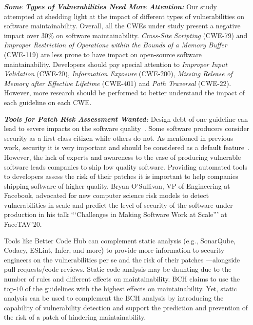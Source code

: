 \documentclass[smallextended]{svjour3}       %
\begin{document}
\textit{\textbf{Some Types of Vulnerabilities Need More Attention:}} 
Our study attempted at shedding light at the impact 
of different types of vulnerabilities on software maintainability.
Overall, all the CWEs under study present a negative impact
over $30\%$ on software maintainability. 
\emph{Cross-Site Scripting} (CWE-79) and \emph{Improper 
Restriction of Operations within the Bounds of a Memory Buffer} (CWE-119) 
are less prone to have impact on open-source software maintainability.
Developers should pay special attention to \emph{Improper Input Validation} (CWE-20), 
\emph{Information Exposure} (CWE-200), \emph{Missing Release of Memory after Effective Lifetime} 
(CWE-401) and \emph{Path Traversal} (CWE-22). However, 
more research should be performed to better understand 
the impact of each guideline on each CWE.

\textit{\textbf{Tools for Patch Risk Assessment Wanted:}}
	Design debt of one guideline can lead to severe impacts on the 
	software quality~\cite{10.1145/1985362.1985366}. Some software 
	producers consider security as a first class citizen while others 
	do not. As mentioned in previous work, security it is very important 
	and should be considered as a default feature~\cite{10.1145/2489828.2489830,kurilova2014wyvern,mcgraw2004software}. 
	However, the lack of experts and awareness to the ease of producing 
	vulnerable software leads companies to ship low quality software. 
	Providing automated tools to developers assess the risk of their 
  patches it is important to help companies shipping software of higher quality. 
  Bryan O’Sullivan, VP of Engineering at Facebook, advocated for new computer science
  risk models to detect vulnerabilities in scale and predict the level of security of the software under production in
  his talk “‘Challenges in Making Software Work at Scale”’ at FaceTAV’20.

	Tools like Better Code Hub can complement static analysis (e.g., 
  SonarQube, Codacy, ESLint, Infer, and more) to provide more information 
  to security engineers on the vulnerabilities per se and the risk of their patches
  ---alongside pull requests/code reviews.
  Static code analysis may be daunting due 
	to the number of rules and different effects
	on maintainability. BCH claims to use the top-$10$ of the guidelines
	with the highest effects on maintainability. Yet, static analysis 
	can be used to complement the BCH analysis by introducing
	the capability of vulnerability detection and support the prediction 
	and prevention of the risk of a patch of hindering maintainability.
%
\end{document}
